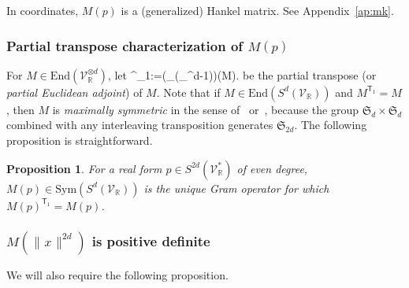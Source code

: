 \documentclass[11pt]{article}
\numberwithin{theorem}{section}
\newtheorem{prop}[theorem]{Proposition}
\theoremstyle{definition}
\newtheorem{remark}[theorem]{Remark}
\newcommand{\tinyspace}{\mspace{1mu}}
\renewcommand{\t}{{\scriptscriptstyle\mathsf{T}}}
\newcommand{\norm}[1]{\lVert\tinyspace #1 \tinyspace\rVert}
\newcommand{\I}{\mathds{1}}
\newcommand{\setft}[1]{\mathrm{#1}}
\newcommand{\Sym}{\setft{Sym}}
\newcommand{\Trans}{\mathsf{T}}
\newcommand{\real}{\mathbb{R}}
\newcommand\V{\mathcal{V}}
\newcommand{\End}{\setft{End}}
\newcommand{\frakS}{\mathfrak{S}}
\def\ba#1\ea{\begin{align}#1\end{align}}
\newcommand{\Vr}{\V_{\real}}
\begin{document}
In coordinates, $M(p)$ is a (generalized) Hankel matrix. See Appendix~\ref{ap:mk}.



\subsubsection*{Partial transpose characterization of $M(p)$}
For $M \in \End(\Vr^{\otimes d})$, let
\ba
M^{\t_1}:=(\Trans \otimes \I_{\End(\Vr^{\otimes d-1})})(M).
\ea
be the partial transpose (or \textit{partial Euclidean adjoint}) of $M$. Note that if $M\in \End(S^{d}(\Vr))$ and $M^{\t_1}=M$, then $M$ is \textit{maximally symmetric} in the sense of~\cite[Section 3]{doherty2012convergence} or~\cite[Lemma 1.2]{laurent2019notes}, because the group $\frakS_d \times \frakS_d$ combined with any interleaving transposition generates $\frakS_{2d}$. The following proposition is straightforward.

\begin{prop}\label{prop:sym}
For a real form $p \in S^{2d}(\Vr^*)$ of even degree, $M(p) \in \Sym(S^{d}(\Vr))$ is the unique Gram operator for which $M(p)^{\t_1}=M(p)$.
\end{prop}




\subsubsection*{$M(\norm{x}^{2d})$ is positive definite}
We will also require the following proposition.
\end{document}
